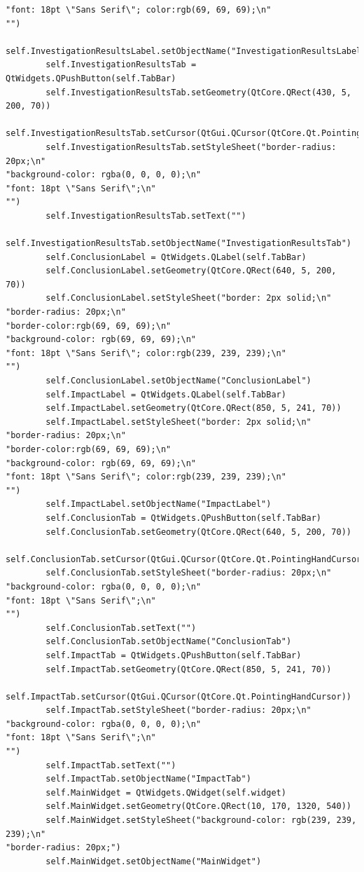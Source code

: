 \documentclass{article}
\begin{document}
\begin{lstlisting}
"font: 18pt \"Sans Serif\"; color:rgb(69, 69, 69);\n"
"")
        self.InvestigationResultsLabel.setObjectName("InvestigationResultsLabel")
        self.InvestigationResultsTab = QtWidgets.QPushButton(self.TabBar)
        self.InvestigationResultsTab.setGeometry(QtCore.QRect(430, 5, 200, 70))
        self.InvestigationResultsTab.setCursor(QtGui.QCursor(QtCore.Qt.PointingHandCursor))
        self.InvestigationResultsTab.setStyleSheet("border-radius: 20px;\n"
"background-color: rgba(0, 0, 0, 0);\n"
"font: 18pt \"Sans Serif\";\n"
"")
        self.InvestigationResultsTab.setText("")
        self.InvestigationResultsTab.setObjectName("InvestigationResultsTab")
        self.ConclusionLabel = QtWidgets.QLabel(self.TabBar)
        self.ConclusionLabel.setGeometry(QtCore.QRect(640, 5, 200, 70))
        self.ConclusionLabel.setStyleSheet("border: 2px solid;\n"
"border-radius: 20px;\n"
"border-color:rgb(69, 69, 69);\n"
"background-color: rgb(69, 69, 69);\n"
"font: 18pt \"Sans Serif\"; color:rgb(239, 239, 239);\n"
"")
        self.ConclusionLabel.setObjectName("ConclusionLabel")
        self.ImpactLabel = QtWidgets.QLabel(self.TabBar)
        self.ImpactLabel.setGeometry(QtCore.QRect(850, 5, 241, 70))
        self.ImpactLabel.setStyleSheet("border: 2px solid;\n"
"border-radius: 20px;\n"
"border-color:rgb(69, 69, 69);\n"
"background-color: rgb(69, 69, 69);\n"
"font: 18pt \"Sans Serif\"; color:rgb(239, 239, 239);\n"
"")
        self.ImpactLabel.setObjectName("ImpactLabel")
        self.ConclusionTab = QtWidgets.QPushButton(self.TabBar)
        self.ConclusionTab.setGeometry(QtCore.QRect(640, 5, 200, 70))
        self.ConclusionTab.setCursor(QtGui.QCursor(QtCore.Qt.PointingHandCursor))
        self.ConclusionTab.setStyleSheet("border-radius: 20px;\n"
"background-color: rgba(0, 0, 0, 0);\n"
"font: 18pt \"Sans Serif\";\n"
"")
        self.ConclusionTab.setText("")
        self.ConclusionTab.setObjectName("ConclusionTab")
        self.ImpactTab = QtWidgets.QPushButton(self.TabBar)
        self.ImpactTab.setGeometry(QtCore.QRect(850, 5, 241, 70))
        self.ImpactTab.setCursor(QtGui.QCursor(QtCore.Qt.PointingHandCursor))
        self.ImpactTab.setStyleSheet("border-radius: 20px;\n"
"background-color: rgba(0, 0, 0, 0);\n"
"font: 18pt \"Sans Serif\";\n"
"")
        self.ImpactTab.setText("")
        self.ImpactTab.setObjectName("ImpactTab")
        self.MainWidget = QtWidgets.QWidget(self.widget)
        self.MainWidget.setGeometry(QtCore.QRect(10, 170, 1320, 540))
        self.MainWidget.setStyleSheet("background-color: rgb(239, 239, 239);\n"
"border-radius: 20px;")
        self.MainWidget.setObjectName("MainWidget")

\end{lstlisting}
\end{document}
